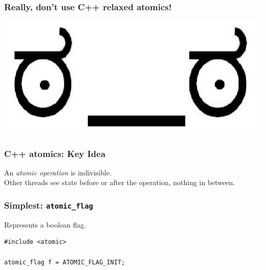 \documentclass[aspectratio=43]{beamer}
\newenvironment{changemargin}[1]{%
  \begin{list}{}{%
    \setlength{\topsep}{0pt}%
    \setlength{\leftmargin}{#1}%
    \setlength{\rightmargin}{1em}
    \setlength{\listparindent}{\parindent}%
    \setlength{\itemindent}{\parindent}%
    \setlength{\parsep}{\parskip}%
  }%
  \item[]}{\end{list}}
\begin{document}
\begin{frame}[fragile]
  \frametitle{Really, don't use C++ relaxed atomics!}
  \begin{center}
    \includegraphics[width=.8\textwidth]{L10/look_of_disapproval}
  \end{center}
\end{frame}

\begin{frame}[fragile]
  \frametitle{C++ atomics: Key Idea}
  \begin{changemargin}{2cm}
    An \emph{atomic operation} is indivisible.\\[1em]
    Other threads see state before or after the operation,
    nothing in between.
  \end{changemargin}
\end{frame}

\begin{frame}[fragile]
  \frametitle{Simplest: {\tt atomic\_flag}}
  \begin{changemargin}{2cm}
    Represents a boolean flag.\\[1em]
    \begin{lstlisting}
#include <atomic>

atomic_flag f = ATOMIC_FLAG_INIT;
    \end{lstlisting}
  \end{changemargin}
\end{frame}
\end{document}

